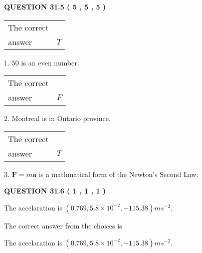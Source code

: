 \documentclass[12pt]{article}
\begin{document}
  
 
 
 
 
  
\vspace{0.2in}
  
{\textbf{\Large{QUESTION
31.5 
 (           5 ,           5 ,           5 )
}}}
  
  
 
 
\noindent{}

 
\noindent\begin{tabular}{|l|l|}\hline The correct & \\
          answer &  %
$T$ \\ \hline \end{tabular}
1. $ %
50$ is an  %
even number.
 
\noindent\begin{tabular}{|l|l|}\hline The correct & \\
          answer &  %
$F$ \\ \hline \end{tabular}
2.  %
Montreal is in  %
Ontario province.
 
\noindent\begin{tabular}{|l|l|}\hline The correct & \\
          answer &  %
$T$ \\ \hline \end{tabular}
3.  %
$\mathbf{F}=m\mathbf{a}$ is a mathmatical form of  %
the Newton's Second Law.
 
 
 
  
\vspace{0.2in}
  
{\textbf{\Large{QUESTION
31.6 
 (           1 ,           1 ,           1 )
}}}
  
  


 
 
\noindent{}
 
 
The accelaration is $  %
(
0.769,
5.8 \times 10^{-2},
-115.38)
ms^{-2} $.
 
 
 
 
 
 
\noindent{}

The correct answer from the choices is


The accelaration is $  %
(
0.769,
5.8 \times 10^{-2},
-115.38)
ms^{-2} $.
 
\end{document}
